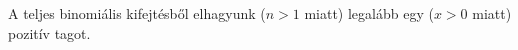 A teljes binomiális kifejtésből elhagyunk ($n>1$ miatt) legalább egy ($x>0$ miatt) 
pozitív tagot. 
